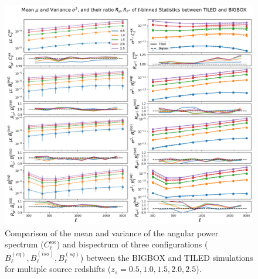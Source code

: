 \begin{figure}[ht]
    \centering
    \includegraphics[width=\textwidth]{figures/results/ell_main.png}
    \caption[Comparison of the mean and variance of $C^{\kappa\kappa}_{\ell}$ and Bispectrum]{Comparison of the mean and variance of the angular power spectrum ($C^{\kappa\kappa}_{\ell}$) and bispectrum of three configurations ($B_{\ell}^{(eq)}, B_{\ell}^{(iso)}, B_{\ell}^{(sq)}$) between the BIGBOX and TILED simulations for multiple source redshifts ($z_s = 0.5, 1.0, 1.5, 2.0, 2.5$).}
    \label{fig:ell_main}
\end{figure}

